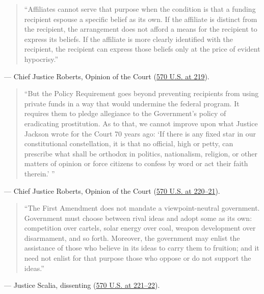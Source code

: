 \documentclass[12pt]{article}
\begin{document}
\begin{quote}
``Affiliates cannot serve that purpose when the condition is that a funding recipient espouse a specific belief as its own. If the affiliate is distinct from the recipient, the arrangement does not afford a means for the recipient to express its beliefs. If the affiliate is more clearly identified with the recipient, the recipient can express those beliefs only at the price of evident hypocrisy.''
\end{quote}
\noindent --- Chief Justice Roberts, Opinion of the Court (\href{https://supreme.justia.com/cases/federal/us/570/205/}{570 U.S. at 219}).

\begin{quote}
``But the Policy Requirement goes beyond preventing recipients from using private funds in a way that would undermine the federal program. It requires them to pledge allegiance to the Government's policy of eradicating prostitution. As to that, we cannot improve upon what Justice Jackson wrote for the Court 70 years ago: `If there is any fixed star in our constitutional constellation, it is that no official, high or petty, can prescribe what shall be orthodox in politics, nationalism, religion, or other matters of opinion or force citizens to confess by word or act their faith therein.' ''
\end{quote}
\noindent --- Chief Justice Roberts, Opinion of the Court (\href{https://supreme.justia.com/cases/federal/us/570/205/}{570 U.S. at 220--21}).

\begin{quote}
``The First Amendment does not mandate a viewpoint-neutral government. Government must choose between rival ideas and adopt some as its own: competition over cartels, solar energy over coal, weapon development over disarmament, and so forth. Moreover, the government may enlist the assistance of those who believe in its ideas to carry them to fruition; and it need not enlist for that purpose those who oppose or do not support the ideas.''
\end{quote}
\noindent --- Justice Scalia, dissenting (\href{https://supreme.justia.com/cases/federal/us/570/205/}{570 U.S. at 221--22}).
\end{document}
